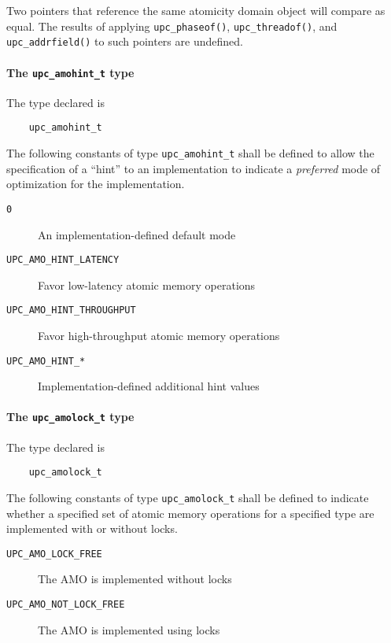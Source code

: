 \np Two pointers that reference the same atomicity domain object will compare
    as equal.  The results of applying {\tt upc\_phaseof()},
    {\tt upc\_threadof()}, and {\tt upc\_addrfield()} to such pointers are
    undefined.

\paragraph{The {\tt upc\_amohint\_t} type}

\npf The type declared is
\begin{verbatim}
    upc_amohint_t
\end{verbatim}

\np The following constants of type {\tt upc\_amohint\_t} shall be defined
    to allow the specification of a ``hint'' to an implementation to indicate
    a \emph{preferred} mode of optimization for the implementation.
\begin{description}
  \item[{\tt 0}]
    An implementation-defined default mode
  \item[{\tt UPC\_AMO\_HINT\_LATENCY}]
    Favor low-latency atomic memory operations
  \item[{\tt UPC\_AMO\_HINT\_THROUGHPUT}]
    Favor high-throughput atomic memory operations
  \item[{\tt UPC\_AMO\_HINT\_*}]
    Implementation-defined additional hint values
\end{description}

\paragraph{The {\tt upc\_amolock\_t} type}

\npf The type declared is
\begin{verbatim}
    upc_amolock_t
\end{verbatim}

\np The following constants of type {\tt upc\_amolock\_t} shall be defined
    to indicate whether a specified set of atomic memory operations for a
    specified type are implemented with or without locks.
\begin{description}
  \item[{\tt UPC\_AMO\_LOCK\_FREE}]
    The AMO is implemented without locks
  \item[{\tt UPC\_AMO\_NOT\_LOCK\_FREE}]
    The AMO is implemented using locks
\end{description}

